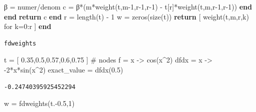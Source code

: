 \documentclass[
]{article}
\newenvironment{Shaded}{\begin{snugshade}}{\end{snugshade}}
\newcommand{\CommentTok}[1]{\textcolor[rgb]{0.37,0.37,0.37}{#1}}
\newcommand{\ControlFlowTok}[1]{\textcolor[rgb]{0.00,0.23,0.31}{\textbf{#1}}}
\newcommand{\FloatTok}[1]{\textcolor[rgb]{0.68,0.00,0.00}{#1}}
\newcommand{\FunctionTok}[1]{\textcolor[rgb]{0.28,0.35,0.67}{#1}}
\newcommand{\NormalTok}[1]{\textcolor[rgb]{0.00,0.23,0.31}{#1}}
\newcommand{\OperatorTok}[1]{\textcolor[rgb]{0.37,0.37,0.37}{#1}}
\begin{document}
\begin{Shaded}
\begin{Highlighting}[]
\NormalTok{                β }\OperatorTok{=}\NormalTok{ numer}\OperatorTok{/}\NormalTok{denom }
\NormalTok{                c }\OperatorTok{=} \FunctionTok{β*}\NormalTok{(}\FunctionTok{m*weight}\NormalTok{(t,m}\OperatorTok{{-}}\FloatTok{1}\NormalTok{,r}\OperatorTok{{-}}\FloatTok{1}\NormalTok{,r}\OperatorTok{{-}}\FloatTok{1}\NormalTok{) }\OperatorTok{{-}}\NormalTok{ t[r]}\FunctionTok{*weight}\NormalTok{(t,m,r}\OperatorTok{{-}}\FloatTok{1}\NormalTok{,r}\OperatorTok{{-}}\FloatTok{1}\NormalTok{))}
            \ControlFlowTok{end}
        \ControlFlowTok{end}
        \ControlFlowTok{return}\NormalTok{ c }
    \ControlFlowTok{end}
\NormalTok{    r }\OperatorTok{=} \FunctionTok{length}\NormalTok{(t) }\OperatorTok{{-}} \FloatTok{1}
\NormalTok{    w }\OperatorTok{=} \FunctionTok{zeros}\NormalTok{(}\FunctionTok{size}\NormalTok{(t))}
    \ControlFlowTok{return}\NormalTok{ [ }\FunctionTok{weight}\NormalTok{(t,m,r,k) for k}\OperatorTok{=}\FloatTok{0}\OperatorTok{:}\NormalTok{r ]}
\ControlFlowTok{end}
\end{Highlighting}
\end{Shaded}

\begin{verbatim}
fdweights
\end{verbatim}

\begin{Shaded}
\begin{Highlighting}[]
\NormalTok{t }\OperatorTok{=}\NormalTok{ [ }\FloatTok{0.35}\NormalTok{,}\FloatTok{0.5}\NormalTok{,}\FloatTok{0.57}\NormalTok{,}\FloatTok{0.6}\NormalTok{,}\FloatTok{0.75}\NormalTok{ ]    }\CommentTok{\# nodes}
\NormalTok{f }\OperatorTok{=}\NormalTok{ x }\OperatorTok{{-}\textgreater{}} \FunctionTok{cos}\NormalTok{(x}\OperatorTok{\^{}}\FloatTok{2}\NormalTok{)}
\NormalTok{dfdx }\OperatorTok{=}\NormalTok{ x }\OperatorTok{{-}\textgreater{}} \FunctionTok{{-}2*x*sin}\NormalTok{(x}\OperatorTok{\^{}}\FloatTok{2}\NormalTok{)}
\NormalTok{exact\_value }\OperatorTok{=} \FunctionTok{dfdx}\NormalTok{(}\FloatTok{0.5}\NormalTok{)}
\end{Highlighting}
\end{Shaded}

\begin{verbatim}
-0.24740395925452294
\end{verbatim}

\begin{Shaded}
\begin{Highlighting}[]
\NormalTok{w }\OperatorTok{=} \FunctionTok{fdweights}\NormalTok{(t}\OperatorTok{.{-}}\FloatTok{0.5}\NormalTok{,}\FloatTok{1}\NormalTok{)}
\end{Highlighting}
\end{Shaded}
\end{document}
